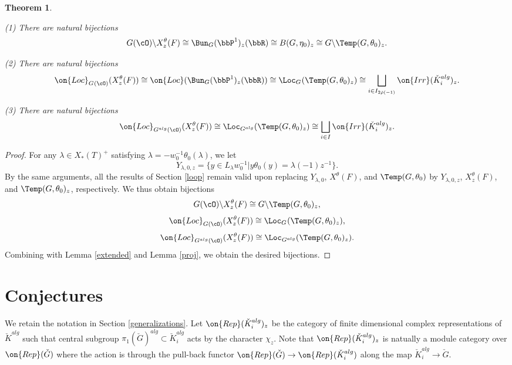 \documentclass[12pt]{amsart}
\newtheorem{thm}{Theorem}
\theoremstyle{remark}
\begin{document}
\begin{thm}\label{Main:gen}


     (1) There are natural bijections
    \[G(\cO)\backslash X^{\theta }_z(F)\cong \Bun_G(\bbP^1)_{z}(\bbR)\cong B(G,\eta_0)_z \cong G\backslash\Temp(G,\theta_0)_z.\]

  (2) There are natural bijections
\[\on{Loc}_{G^{}(\cO)}( X^{\theta }_z(F))\cong
\on{Loc}(\Bun_G(\bbP^1)_{z}(\bbR))\cong
\Loc_{G^{}}(\Temp(G,\theta_0)_z)\cong\bigsqcup_{i\in I_{2\check\rho(-1)}}\on{Irr}(\check K^{alg}_i)_z.\]
    
(3) There are natural bijections
\[\on{Loc}_{G^{alg}(\cO)}(X^{\theta }_z(F))\cong\Loc_{G^{alg}}(\Temp(G,\theta_0)_z)\cong\bigsqcup_{i\in I}\on{Irr}(\check K^{alg}_i)_z.\]


\end{thm}
\begin{proof}
For any $\lambda\in X_*(T)^+$ satisfying $\lambda=-w_0^{-1}\theta_0(\lambda)$, we let
    \[Y_{\lambda,0,z}=\{y\in L_\lambda w_0^{-1}|y\theta_0(y)=\lambda(-1)z^{-1}\}.\]
    By the same arguments, all the results of Section \ref{loop} remain valid upon replacing $Y_{\lambda,0}$, $X^\theta(F)$, and $\Temp(G,\theta_0)$ by $Y_{\lambda,0,z}$, $X^\theta_z(F)$, and $\Temp(G,\theta_0)_z$, respectively. We thus obtain bijections
    \[G(\cO)\backslash X^{\theta }_z(F)\cong G\backslash\Temp(G,\theta_0)_z, \]
    \[\on{Loc}_{G(\cO)}(X^{\theta }_z(F))\cong \Loc_{G^{}}(\Temp(G,\theta_0)_z),\]
   \[\on{Loc}_{G^{alg}(\cO)}(X^{\theta }_z(F))\cong \Loc_{G^{alg}}(\Temp(G,\theta_0)_z).\]
Combining with Lemma \ref{extended}
and Lemma \ref{proj}, we obtain the desired bijections.




\end{proof}





\section{Conjectures}\label{conj}
We retain the notation in Section \ref{generalizations}.
Let $\on{Rep}(\check K^{alg}_i)_z$
be the category of finite dimensional complex representations of $\check K^{alg}$  
such that  
central subgroup $\pi_1(\check G)^{alg}\subset\check K_{i}^{alg}$
acts by the character $\chi_z$.
Note that $\on{Rep}(\check K^{alg}_i)_z$ is natually a module category over $\on{Rep}(\check G)$
where the action is through the pull-back functor $\on{Rep}(\check G)\to\on{Rep}(\check K^{alg}_i)$
along the map $\check K^{alg}_i\to\check G$.
\end{document}
